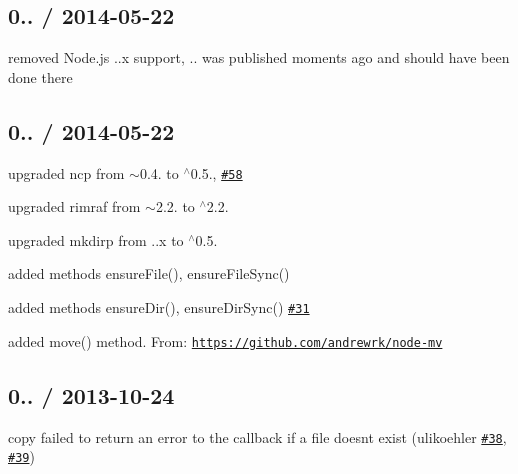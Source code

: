 \subsection*{0.. / 2014-\/05-\/22 }


\begin{DoxyItemize}
\item removed Node.\+js {..\+x} support, {..} was published moments ago and should have been done there
\end{DoxyItemize}

\subsection*{0.. / 2014-\/05-\/22 }


\begin{DoxyItemize}
\item upgraded {\ttfamily ncp} from {\ttfamily $\sim$0.4.} to {\ttfamily $^\wedge$0.5.}, \href{https://github.com/jprichardson/node-fs-extra/issues/58}{\tt \#58}
\item upgraded {\ttfamily rimraf} from {\ttfamily $\sim$2.2.} to {\ttfamily $^\wedge$2.2.}
\item upgraded {\ttfamily mkdirp} from {..\+x} to {\ttfamily $^\wedge$0.5.}
\item added methods {\ttfamily ensure\+File()}, {\ttfamily ensure\+File\+Sync()}
\item added methods {\ttfamily ensure\+Dir()}, {\ttfamily ensure\+Dir\+Sync()} \href{https://github.com/jprichardson/node-fs-extra/issues/31}{\tt \#31}
\item added {\ttfamily move()} method. From\+: \href{https://github.com/andrewrk/node-mv}{\tt https\+://github.\+com/andrewrk/node-\/mv}
\end{DoxyItemize}

\subsection*{0.. / 2013-\/10-\/24 }


\begin{DoxyItemize}
\item copy failed to return an error to the callback if a file doesn\textquotesingle{}t exist (ulikoehler \href{https://github.com/jprichardson/node-fs-extra/pull/38}{\tt \#38}, \href{https://github.com/jprichardson/node-fs-extra/pull/39}{\tt \#39})
\end{DoxyItemize}

